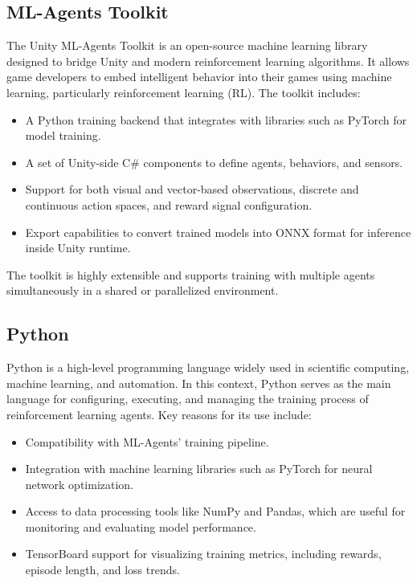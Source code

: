 \documentclass[12pt,oneside,openright,a4paper]{cpe-english-project}
\begin{document}
\subsection{ML-Agents Toolkit}
The Unity ML-Agents Toolkit is an open-source machine learning library designed to bridge Unity and modern reinforcement learning algorithms. It allows game developers to embed intelligent behavior into their games using machine learning, particularly reinforcement learning (RL). The toolkit includes:
\begin{itemize}
\item A Python training backend that integrates with libraries such as PyTorch for model training.
\item A set of Unity-side C\# components to define agents, behaviors, and sensors.
\item Support for both visual and vector-based observations, discrete and continuous action spaces, and reward signal configuration.
\item Export capabilities to convert trained models into ONNX format for inference inside Unity runtime.
\end{itemize}
The toolkit is highly extensible and supports training with multiple agents simultaneously in a shared or parallelized environment.

\subsection{Python}
Python is a high-level programming language widely used in scientific computing, machine learning, and automation. In this context, Python serves as the main language for configuring, executing, and managing the training process of reinforcement learning agents. Key reasons for its use include:
\begin{itemize}
\item Compatibility with ML-Agents' training pipeline.
\item Integration with machine learning libraries such as PyTorch for neural network optimization.
\item Access to data processing tools like NumPy and Pandas, which are useful for monitoring and evaluating model performance.
\item TensorBoard support for visualizing training metrics, including rewards, episode length, and loss trends.
\end{itemize}
\end{document}
